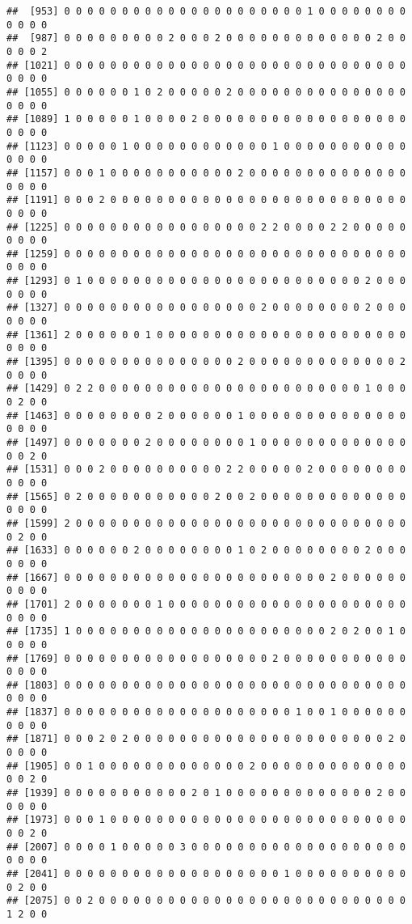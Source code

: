 \documentclass[12pt,]{article}
\begin{document}
\begin{verbatim}
##  [953] 0 0 0 0 0 0 0 0 0 0 0 0 0 0 0 0 0 0 0 0 0 1 0 0 0 0 0 0 0 0 0 0 0 0
##  [987] 0 0 0 0 0 0 0 0 0 2 0 0 0 2 0 0 0 0 0 0 0 0 0 0 0 0 0 2 0 0 0 0 0 2
## [1021] 0 0 0 0 0 0 0 0 0 0 0 0 0 0 0 0 0 0 0 0 0 0 0 0 0 0 0 0 0 0 0 0 0 0
## [1055] 0 0 0 0 0 0 1 0 2 0 0 0 0 0 2 0 0 0 0 0 0 0 0 0 0 0 0 0 0 0 0 0 0 0
## [1089] 1 0 0 0 0 0 1 0 0 0 0 2 0 0 0 0 0 0 0 0 0 0 0 0 0 0 0 0 0 0 0 0 0 0
## [1123] 0 0 0 0 0 1 0 0 0 0 0 0 0 0 0 0 0 0 1 0 0 0 0 0 0 0 0 0 0 0 0 0 0 0
## [1157] 0 0 0 1 0 0 0 0 0 0 0 0 0 0 0 2 0 0 0 0 0 0 0 0 0 0 0 0 0 0 0 0 0 0
## [1191] 0 0 0 2 0 0 0 0 0 0 0 0 0 0 0 0 0 0 0 0 0 0 0 0 0 0 0 0 0 0 0 0 0 0
## [1225] 0 0 0 0 0 0 0 0 0 0 0 0 0 0 0 0 0 2 2 0 0 0 0 2 2 0 0 0 0 0 0 0 0 0
## [1259] 0 0 0 0 0 0 0 0 0 0 0 0 0 0 0 0 0 0 0 0 0 0 0 0 0 0 0 0 0 0 0 0 0 0
## [1293] 0 1 0 0 0 0 0 0 0 0 0 0 0 0 0 0 0 0 0 0 0 0 0 0 0 0 2 0 0 0 0 0 0 0
## [1327] 0 0 0 0 0 0 0 0 0 0 0 0 0 0 0 0 0 2 0 0 0 0 0 0 0 0 2 0 0 0 0 0 0 0
## [1361] 2 0 0 0 0 0 0 1 0 0 0 0 0 0 0 0 0 0 0 0 0 0 0 0 0 0 0 0 0 0 0 0 0 0
## [1395] 0 0 0 0 0 0 0 0 0 0 0 0 0 0 0 2 0 0 0 0 0 0 0 0 0 0 0 0 0 2 0 0 0 0
## [1429] 0 2 2 0 0 0 0 0 0 0 0 0 0 0 0 0 0 0 0 0 0 0 0 0 0 0 1 0 0 0 0 2 0 0
## [1463] 0 0 0 0 0 0 0 0 2 0 0 0 0 0 0 1 0 0 0 0 0 0 0 0 0 0 0 0 0 0 0 0 0 0
## [1497] 0 0 0 0 0 0 0 2 0 0 0 0 0 0 0 0 1 0 0 0 0 0 0 0 0 0 0 0 0 0 0 0 2 0
## [1531] 0 0 0 2 0 0 0 0 0 0 0 0 0 0 2 2 0 0 0 0 0 2 0 0 0 0 0 0 0 0 0 0 0 0
## [1565] 0 2 0 0 0 0 0 0 0 0 0 0 0 2 0 0 2 0 0 0 0 0 0 0 0 0 0 0 0 0 0 0 0 0
## [1599] 2 0 0 0 0 0 0 0 0 0 0 0 0 0 0 0 0 0 0 0 0 0 0 0 0 0 0 0 0 0 0 2 0 0
## [1633] 0 0 0 0 0 0 2 0 0 0 0 0 0 0 0 1 0 2 0 0 0 0 0 0 0 0 2 0 0 0 0 0 0 0
## [1667] 0 0 0 0 0 0 0 0 0 0 0 0 0 0 0 0 0 0 0 0 0 0 0 2 0 0 0 0 0 0 0 0 0 0
## [1701] 2 0 0 0 0 0 0 0 1 0 0 0 0 0 0 0 0 0 0 0 0 0 0 0 0 0 0 0 0 0 0 0 0 0
## [1735] 1 0 0 0 0 0 0 0 0 0 0 0 0 0 0 0 0 0 0 0 0 0 0 2 0 2 0 0 1 0 0 0 0 0
## [1769] 0 0 0 0 0 0 0 0 0 0 0 0 0 0 0 0 0 0 2 0 0 0 0 0 0 0 0 0 0 0 0 0 0 0
## [1803] 0 0 0 0 0 0 0 0 0 0 0 0 0 0 0 0 0 0 0 0 0 0 0 0 0 0 0 0 0 0 0 0 0 0
## [1837] 0 0 0 0 0 0 0 0 0 0 0 0 0 0 0 0 0 0 0 0 1 0 0 1 0 0 0 0 0 0 0 0 0 0
## [1871] 0 0 0 2 0 2 0 0 0 0 0 0 0 0 0 0 0 0 0 0 0 0 0 0 0 0 0 0 2 0 0 0 0 0
## [1905] 0 0 1 0 0 0 0 0 0 0 0 0 0 0 0 0 2 0 0 0 0 0 0 0 0 0 0 0 0 0 0 0 2 0
## [1939] 0 0 0 0 0 0 0 0 0 0 0 2 0 1 0 0 0 0 0 0 0 0 0 0 0 0 0 2 0 0 0 0 0 0
## [1973] 0 0 0 1 0 0 0 0 0 0 0 0 0 0 0 0 0 0 0 0 0 0 0 0 0 0 0 0 0 0 0 0 2 0
## [2007] 0 0 0 0 1 0 0 0 0 0 3 0 0 0 0 0 0 0 0 0 0 0 0 0 0 0 0 0 0 0 0 0 0 0
## [2041] 0 0 0 0 0 0 0 0 0 0 0 0 0 0 0 0 0 0 0 1 0 0 0 0 0 0 0 0 0 0 0 2 0 0
## [2075] 0 0 2 0 0 0 0 0 0 0 0 0 0 0 0 0 0 0 0 0 0 0 0 0 0 0 0 0 0 0 1 2 0 0

\end{verbatim}
\end{document}
